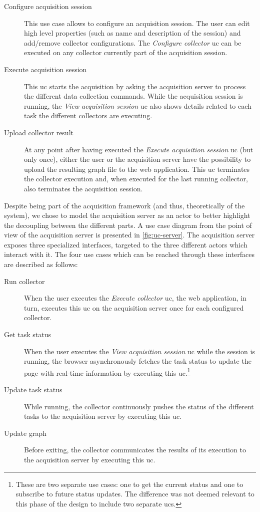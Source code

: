\begin{description}
  \item[Configure acquisition session] This use case allows to configure an acquisition session. The user can edit high level properties (such as name and description of the session) and add/remove collector configurations. The \emph{Configure collector} \gls{uc} can be executed on any collector currently part of the acquisition session.
  \item[Execute acquisition session] This \gls{uc} starts the acquisition by asking the acquisition server to process the different data collection commands. While the acquisition session is running, the \emph{View acquisition session} \gls{uc} also shows details related to each task the different collectors are executing.
  \item[Upload collector result] At any point after having executed the \emph{Execute acquisition session} \gls{uc} (but only once), either the user or the acquisition server have the possibility to upload the resulting graph file to the web application. This \gls{uc} terminates the collector execution and, when executed for the last running collector, also terminates the acquisition session.
\end{description}

Despite being part of the acquisition framework (and thus, theoretically of the system), we chose to model the acquisition server as an actor to better highlight the decoupling between the different parts. A use case diagram from the point of view of the acquisition server is presented in \vref{fig:uc-server}. The acquisition server exposes three specialized interfaces, targeted to the three different actors which interact with it. The four use cases which can be reached through these interfaces are described as follows:

\begin{description}
  \item[Run collector] When the user executes the \emph{Execute collector} \gls{uc}, the web application, in turn, executes this \gls{uc} on the acquisition server once for each configured collector.
  \item[Get task status] When the user executes the \emph{View acquisition session} \gls{uc} while the session is running, the browser asynchronously fetches the task status to update the page with real-time information by executing this \gls{uc}.\footnote{These are two separate use cases: one to get the current status and one to subscribe to future status updates. The difference was not deemed relevant to this phase of the design to include two separate \glspl{uc}.}
  \item[Update task status] While running, the collector continuously pushes the status of the different tasks to the acquisition server by executing this \gls{uc}.
  \item[Update graph] Before exiting, the collector communicates the results of its execution to the acquisition server by executing this \gls{uc}.
\end{description}

